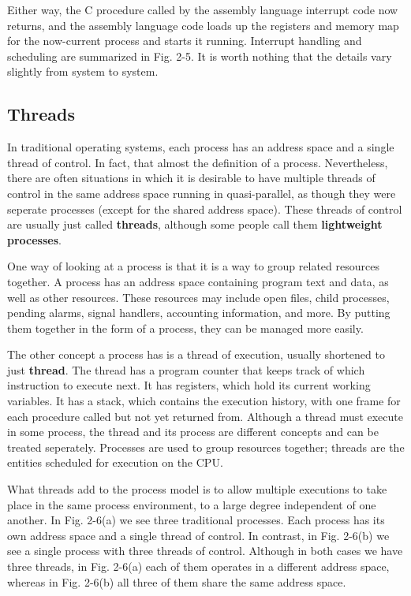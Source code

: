 \documentclass{book}
\newcommand {\kw}  [1] {\textbf{#1}}
\begin{document}
Either way, the C procedure called by the assembly language interrupt code now returns,
and the assembly language code loads up the registers and memory map for the now-current process and starts it running.
Interrupt handling and scheduling are summarized in Fig. 2-5.
It is worth nothing that the details vary slightly from system to system.

\subsection{Threads}
In traditional operating systems, each process has an address space and a single thread of control.
In fact, that almost the definition of a process.
Nevertheless, there are often situations in which it is desirable to 
have multiple threads of control in the same address space running in quasi-parallel,
as though they were seperate processes (except for the shared address space).
These threads of control are usually just called \kw{threads},
although some people call them \kw{lightweight processes}.

One way of looking at a process is that it is a way to group related resources together.
A process has an address space containing program text and data, as well as other resources.
These resources may include open files, child processes, pending alarms, signal handlers, accounting information, and more.
By putting them together in the form of a process, they can be managed more easily.

The other concept a process has is a thread of execution, usually shortened to just \kw{thread}.
The thread has a program counter that keeps track of which instruction to execute next.
It has registers, which hold its current working variables.
It has a stack, which contains the execution history, with one frame for each procedure called but not yet returned from.
Although a thread must execute in some process, the thread and its process are different concepts and can be treated seperately.
Processes are used to group resources together; threads are the entities scheduled for execution on the CPU.

What threads add to the process model is to allow multiple executions to take place in the same process environment,
to a large degree independent of one another.
In Fig. 2-6(a) we see three traditional processes.
Each process has its own address space and a single thread of control.
In contrast, in Fig. 2-6(b) we see a single process with three threads of control.
Although in both cases we have three threads, in Fig. 2-6(a) each of them operates in a different address space, 
whereas in Fig. 2-6(b) all three of them share the same address space.
\end{document}
